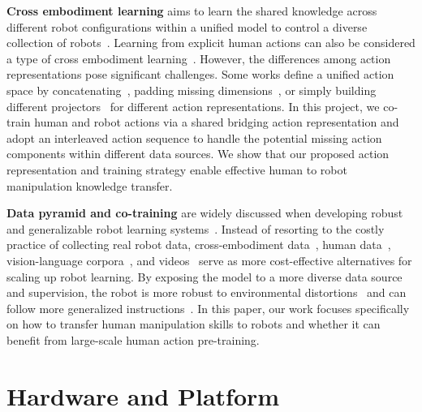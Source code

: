 \documentclass{llmxive}
\providecommand{\myparagraph}[1]{\vspace{0.1em}\noindent\textbf{#1}}
\begin{document}
\myparagraph{Cross embodiment learning} aims to learn the shared knowledge across different robot configurations within a unified model to control a diverse collection of robots~\cite{o2024open,team2024octo,black2024pi_0,intelligence2025pi_0.5,yang2024pushing}.
% 
Learning from explicit human actions can also be considered a type of cross embodiment learning~\cite{kareer2025egomimic,punamiya2025egobridge,zheng2026egoscale,zhu2026emma}.
% 
However, the differences among action representations pose significant challenges.
% 
Some works define a unified action space by concatenating~\cite{liu2024rdt,cheang2025gr3,kareer2025egomimic}, padding missing dimensions~\cite{black2024pi_0,pertsch2025fast,intelligence2025pi_0.5}, or simply building different projectors~\cite{wang2024scaling,bjorck2025gr00t} for different action representations.
% 
In this project, we co-train human and robot actions via a shared bridging action representation and adopt an interleaved action sequence to handle the potential missing action components within different data sources.
% 
We show that our proposed action representation and training strategy enable effective human to robot manipulation knowledge transfer.



\myparagraph{Data pyramid and co-training} are widely discussed when developing robust and generalizable robot learning systems~\cite{bjorck2025gr00t,barreiros2025careful,lin2026systematic,generalist2026gen1,cheang2025gr3}.
% 
Instead of resorting to the costly practice of collecting real robot data, cross-embodiment data~\cite{o2024open,kim2024openvla,liu2024rdt,black2024pi_0,intelligence2025pi_0.5}, human data~\cite{kareer2025egomimic,zheng2026egoscale,cheang2025gr3}, vision-language corpora~\cite{goyal2017making,chen2015microsoft,li2024llava,zitkovich2023rt2,wu2026pragmatic}, and videos~\cite{bu2025agibot,bjorck2025gr00t,cheang2024gr,wu2023unleashing,hu2024video,ye2026world,li2026causal} serve as more cost-effective alternatives for scaling up robot learning.
% 
By exposing the model to a more diverse data source and supervision, the robot is more robust to environmental distortions~\cite{cheang2025gr3,intelligence2025pi_0.5,lin2026systematic} and can follow more generalized instructions~\cite{zitkovich2023rt2,cheang2025gr3}.
% 
In this paper, our work focuses specifically on how to transfer human manipulation skills to robots and whether it can benefit from large-scale human action pre-training.
\section{Hardware and Platform}
\label{sec:hardware}
\end{document}
